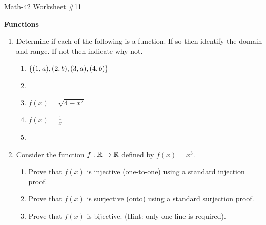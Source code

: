 \documentclass[letterpaper,12pt,fleqn]{article}
\begin{document}
\begin{center}
  \large Math-42 Worksheet \#11

  \textbf{Functions}
\end{center}

\vspace{0.5in}

\begin{enumerate}[left=0in,itemsep=0.5in]
\item Determine if each of the following is a function.  If so then identify the domain and range.  If not then
  indicate why not.
  \begin{enumerate}
  \item \(\{(1,a),(2,b),(3,a),(4,b)\}\)

    \bigskip

  \item

    \bigskip

  \item \(f(x)=\sqrt{4-x^2}\)
  \item \(f(x)=\frac{1}{x}\)

    \bigskip

  \item
  \end{enumerate}

\item Consider the function \(f:\mathbb{R}\to\mathbb{R}\) defined by \(f(x)=x^3\).
  \begin{enumerate}
  \item Prove that \(f(x)\) is injective (one-to-one) using a standard injection proof.
  \item Prove that \(f(x)\) is surjective (onto) using a standard surjection proof.
  \item Prove that \(f(x)\) is bijective.  (Hint: only one line is required).
  \end{enumerate}


\end{enumerate}
\end{document}

